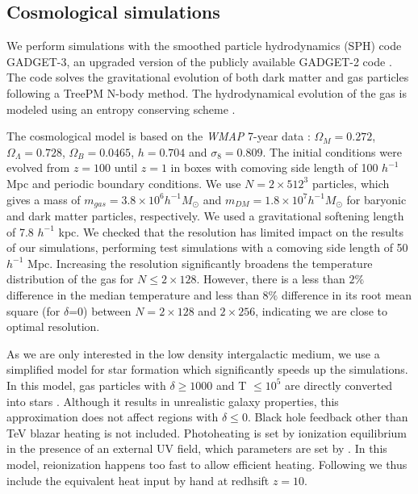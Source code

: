 \documentclass[twocolumns]{emulateapj}
\begin{document}
\subsection{Cosmological simulations}
We perform simulations with the smoothed particle hydrodynamics (SPH)  code \textsc{GADGET-3}, an upgraded version of the publicly available \textsc{GADGET-2} code \citep{2005MNRAS.364.1105S}. The code solves the gravitational evolution of both dark matter and gas particles following a TreePM N-body method. The hydrodynamical evolution of the gas is modeled using an entropy conserving scheme \citep{2002MNRAS.333..649S}.

The cosmological model is based on the \textit{WMAP} 7-year data \citep{2011ApJS..192...18K}: $\Omega_M=0.272$, $\Omega_{\Lambda}=0.728$, $\Omega_{B}= 0.0465$, $h=0.704$ and $\sigma_8=0.809$. The initial conditions were evolved from $z=100$ until $z=1$ in boxes with  comoving side length of 100 $h^{-1}$ Mpc and periodic boundary conditions. We use $N= 2\times 512^3$ particles, which gives a mass of $m_{gas}=3.8\times10^{6} h^{-1} M_{\odot}$ and $m_{DM}=1.8\times 10^{7} h^{-1} M_{\odot}$ for baryonic and dark matter particles, respectively. We used  a gravitational softening length of 7.8 $h^{-1}$ kpc.  We checked that the resolution has limited impact on the results of our simulations, performing test simulations with a comoving side length of  50 $h^{-1}$ Mpc.  Increasing the resolution significantly broadens  the temperature distribution of the gas for $N\leqslant 2\times 128$. However, there is a less than $2\%$ difference in the median temperature and less than $8\%$ difference in its root mean square (for $\delta$=0) between $N=2\times 128$ and $2\times 256$, indicating we are close to optimal resolution. 

As we are only interested in the low density intergalactic medium, we use a simplified model for star formation which significantly speeds up the simulations. In this model, gas particles with $\delta\geq 1000$ and T $\leq 10^5$ are directly converted into stars \citep{2004MNRAS.354..684V}. Although it results in unrealistic galaxy properties, this approximation does not affect regions with $\delta \leq 0$.  Black hole feedback other than TeV blazar heating is not included. Photoheating is set by ionization equilibrium in the presence of an external UV field, which parameters are set by \citet{2009ApJ...703.1416F}. In this model, reionization happens too fast to allow efficient heating. Following \citet{2012MNRAS.423..149P} we thus include the equivalent heat input by hand at redhsift $z=10$.
\end{document}
